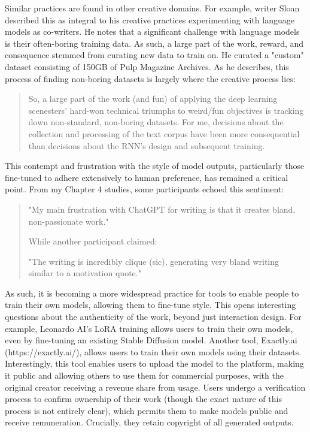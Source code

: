 Similar practices are found in other creative domains. For example, writer Sloan described this as integral to his creative practices experimenting with language models as co-writers. He notes that a significant challenge with language models is their often-boring training data. As such, a large part of the work, reward, and consequence stemmed from curating new data to train on. He curated a "custom" dataset consisting of 150GB of Pulp Magazine Archives. As he describes, this process of finding non-boring datasets is largely where the creative process lies:
\begin{quote}
    So, a large part of the work (and fun) of applying the deep learning scenesters’ hard-won technical triumphs to weird/fun objectives is tracking down non-standard, non-boring datasets. For me, decisions about the collection and processing of the text corpus have been more consequential than decisions about the RNN’s design and subsequent training.
\end{quote}
This contempt and frustration with the style of model outputs, particularly those fine-tuned to adhere extensively to human preference, has remained a critical point. From my Chapter 4 studies, some participants echoed this sentiment:

\begin{quote}
"My main frustration with ChatGPT for writing is that it creates bland, non-passionate work."

While another participant claimed:

"The writing is incredibly clique (sic), generating very bland writing similar to a motivation quote."
\end{quote}

As such, it is becoming a more widespread practice for tools to enable people to train their own models, allowing them to fine-tune style. This opens interesting questions about the authenticity of the work, beyond just interaction design. For example, Leonardo AI's LoRA training allows users to train their own models, even by fine-tuning an existing Stable Diffusion model. Another tool, Exactly.ai (https://exactly.ai/), allows users to train their own models using their datasets. Interestingly, this tool enables users to upload the model to the platform, making it public and allowing others to use them for commercial purposes, with the original creator receiving a revenue share from usage. Users undergo a verification process to confirm ownership of their work (though the exact nature of this process is not entirely clear), which permits them to make models public and receive remuneration. Crucially, they retain copyright of all generated outputs.


